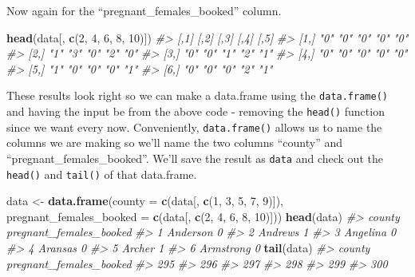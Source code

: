 \documentclass[
  12pt,
]{book}
\newenvironment{Shaded}{\begin{snugshade}}{\end{snugshade}}
\newcommand{\CommentTok}[1]{\textcolor[rgb]{0.37,0.37,0.37}{\textit{#1}}}
\newcommand{\DataTypeTok}[1]{\textcolor[rgb]{0.27,0.27,0.27}{#1}}
\newcommand{\DecValTok}[1]{\textcolor[rgb]{0.06,0.06,0.06}{#1}}
\newcommand{\KeywordTok}[1]{\textcolor[rgb]{0.27,0.27,0.27}{\textbf{#1}}}
\newcommand{\NormalTok}[1]{#1}
\newcommand{\StringTok}[1]{\textcolor[rgb]{0.5,0.5,0.5}{#1}}
\begin{document}
Now again for the ``pregnant\_females\_booked'' column.

\begin{Shaded}
\begin{Highlighting}[]
\KeywordTok{head}\NormalTok{(data[, }\KeywordTok{c}\NormalTok{(}\DecValTok{2}\NormalTok{, }\DecValTok{4}\NormalTok{, }\DecValTok{6}\NormalTok{, }\DecValTok{8}\NormalTok{, }\DecValTok{10}\NormalTok{)])}
\CommentTok{\#\textgreater{}      [,1] [,2] [,3] [,4] [,5]}
\CommentTok{\#\textgreater{} [1,] "0"  "0"  "0"  "0"  "0" }
\CommentTok{\#\textgreater{} [2,] "1"  "3"  "0"  "2"  "0" }
\CommentTok{\#\textgreater{} [3,] "0"  "0"  "1"  "2"  "1" }
\CommentTok{\#\textgreater{} [4,] "0"  "0"  "0"  "0"  "0" }
\CommentTok{\#\textgreater{} [5,] "1"  "0"  "0"  "0"  "1" }
\CommentTok{\#\textgreater{} [6,] "0"  "0"  "0"  "2"  "1"}
\end{Highlighting}
\end{Shaded}

These results look right so we can make a data.frame using the \texttt{data.frame()} and having the input be from the above code - removing the \texttt{head()} function since we want every now. Conveniently, \texttt{data.frame()} allows us to name the columns we are making so we'll name the two columns ``county'' and ``pregnant\_females\_booked''. We'll save the result as \texttt{data} and check out the \texttt{head()} and \texttt{tail()} of that data.frame.

\begin{Shaded}
\begin{Highlighting}[]
\NormalTok{data \textless{}{-}}\StringTok{ }\KeywordTok{data.frame}\NormalTok{(}\DataTypeTok{county =} \KeywordTok{c}\NormalTok{(data[, }\KeywordTok{c}\NormalTok{(}\DecValTok{1}\NormalTok{, }\DecValTok{3}\NormalTok{, }\DecValTok{5}\NormalTok{, }\DecValTok{7}\NormalTok{, }\DecValTok{9}\NormalTok{)]),}
              \DataTypeTok{pregnant\_females\_booked =} \KeywordTok{c}\NormalTok{(data[, }\KeywordTok{c}\NormalTok{(}\DecValTok{2}\NormalTok{, }\DecValTok{4}\NormalTok{, }\DecValTok{6}\NormalTok{, }\DecValTok{8}\NormalTok{, }\DecValTok{10}\NormalTok{)]))}
\KeywordTok{head}\NormalTok{(data)}
\CommentTok{\#\textgreater{}      county pregnant\_females\_booked}
\CommentTok{\#\textgreater{} 1  Anderson                       0}
\CommentTok{\#\textgreater{} 2   Andrews                       1}
\CommentTok{\#\textgreater{} 3  Angelina                       0}
\CommentTok{\#\textgreater{} 4   Aransas                       0}
\CommentTok{\#\textgreater{} 5    Archer                       1}
\CommentTok{\#\textgreater{} 6 Armstrong                       0}
\KeywordTok{tail}\NormalTok{(data)}
\CommentTok{\#\textgreater{}     county pregnant\_females\_booked}
\CommentTok{\#\textgreater{} 295                               }
\CommentTok{\#\textgreater{} 296                               }
\CommentTok{\#\textgreater{} 297                               }
\CommentTok{\#\textgreater{} 298                               }
\CommentTok{\#\textgreater{} 299                               }
\CommentTok{\#\textgreater{} 300}
\end{Highlighting}
\end{Shaded}
\end{document}
